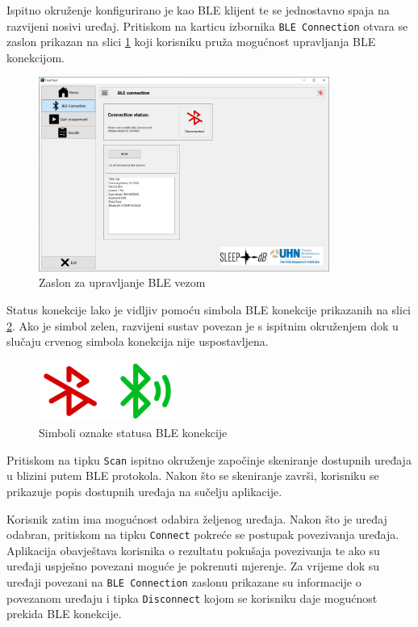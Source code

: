 \documentclass[../diplomski_rad.tex]{subfiles}
\begin{document}
Ispitno okruženje konfigurirano je kao BLE klijent te se jednostavno spaja na razvijeni nosivi uređaj. 
Pritiskom na karticu izbornika \texttt{BLE Connection} otvara se zaslon prikazan na slici \ref{slk:ble} 
koji korisniku pruža mogućnost upravljanja BLE konekcijom.

\begin{figure}[htb]
    \centering
    \includegraphics[width=0.85\textwidth]{Figures/ble.png} 
    \caption{Zaslon za upravljanje BLE vezom}
    \label{slk:ble}
\end{figure}

Status konekcije lako je vidljiv pomoću simbola BLE konekcije prikazanih na slici \ref{slk:ble_status_simboli}.  
Ako je simbol zelen, razvijeni sustav povezan je s ispitnim okruženjem dok u slučaju crvenog simbola konekcija nije uspostavljena.

\begin{figure}[htb]
    \centering
    \includegraphics[width=0.4\textwidth]{Figures/ble_status_simboli.png} 
    \caption{Simboli oznake statusa BLE konekcije \cite{ikone}}
    \label{slk:ble_status_simboli}
\end{figure}

Pritiskom na tipku \texttt{Scan}  ispitno okruženje započinje skeniranje dostupnih uređaja 
u blizini putem BLE protokola. 
Nakon što se skeniranje završi, korisniku se prikazuje popis dostupnih uređaja na sučelju aplikacije.

Korisnik zatim ima mogućnost odabira željenog uređaja. Nakon što je uređaj odabran, pritiskom na tipku \texttt{Connect} 
pokreće se postupak povezivanja uređaja. 
Aplikacija obavještava korisnika o rezultatu pokušaja povezivanja te ako su uređaji uspješno povezani moguće je pokrenuti mjerenje.  
Za vrijeme dok su uređaji povezani na \texttt{BLE Connection} zaslonu prikazane su informacije o povezanom uređaju 
i tipka \texttt{Disconnect} kojom se korisniku daje mogućnost prekida BLE konekcije.
\end{document}
